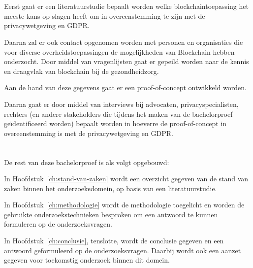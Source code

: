\section{}
\label{sec:onderzoeksdoelstelling}

Eerst gaat er een literatuurstudie bepaalt worden welke blockchaintoepassing het meeste kans op slagen heeft om in overeenstemming te zijn met de privacywetgeving en GDPR. 

Daarna zal er ook contact opgenomen worden met personen en organisaties die voor diverse overheidstoepassingen de mogelijkheden van Blockchain hebben onderzocht. Door middel van vragenlijsten gaat er gepeild worden naar de kennis en draagvlak van blockchain bij de gezondheidzorg. 

Aan de hand van deze gegevens gaat er een proof-of-concept ontwikkeld worden.

Daarna gaat er door middel van interviews bij advocaten, privacyspecialisten, rechters (en andere stakeholders die tijdens het maken van de bachelorproef geïdentificeerd worden) bepaalt worden in hoeverre de proof-of-concept in overeenstemming is met de privacywetgeving en GDPR. 

\section{}
\label{sec:opzet-bachelorproef}


De rest van deze bachelorproef is als volgt opgebouwd:

In Hoofdstuk~\ref{ch:stand-van-zaken} wordt een overzicht gegeven van de stand van zaken binnen het onderzoeksdomein, op basis van een literatuurstudie.

In Hoofdstuk~\ref{ch:methodologie} wordt de methodologie toegelicht en worden de gebruikte onderzoekstechnieken besproken om een antwoord te kunnen formuleren op de onderzoeksvragen.


In Hoofdstuk~\ref{ch:conclusie}, tenslotte, wordt de conclusie gegeven en een antwoord geformuleerd op de onderzoeksvragen. Daarbij wordt ook een aanzet gegeven voor toekomstig onderzoek binnen dit domein.